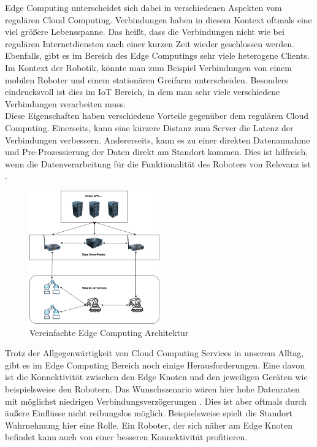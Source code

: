 Edge Computing unterscheidet sich dabei in verschiedenen Aspekten vom regulären Cloud Computing. Verbindungen haben in diesem Kontext oftmals eine viel größere Lebensspanne. Das heißt, dass die Verbindungen nicht wie bei regulären Internetdiensten nach einer kurzen Zeit wieder geschlossen werden. Ebenfalls, gibt es im Bereich des Edge Computings sehr viele heterogene Clients. Im Kontext der Robotik, könnte man zum Beispiel Verbindungen von einem mobilen Roboter und einem stationären Greifarm unterscheiden. Besonders eindrucksvoll ist dies im IoT Bereich, in dem man sehr viele verschiedene Verbindungen verarbeiten muss.\\
Diese Eigenschaften haben verschiedene Vorteile gegenüber dem regulären Cloud Computing. Einerseits, kann eine kürzere Distanz zum Server die Latenz der Verbindungen verbessern. Andererseits, kann es zu einer direkten Datenannahme und Pre-Prozessierung der Daten direkt am Standort kommen. Dies ist hilfreich, wenn die Datenverarbeitung für die Funktionalität des Roboters von Relevanz ist \cite{luntovskyyHighlyDistributedSystemsIoT2022}.

\begin{figure}
  \centering
  \includegraphics[width=0.5\textwidth]{./figures/edge-computing.png}
  \caption{Vereinfachte Edge Computing Architektur}
  \label{fig:edge-computing}
\end{figure}

Trotz der Allgegenwärtigkeit von Cloud Computing Services in unserem Alltag\cite{GartnerForecastsWorldwide2022}, gibt es im Edge Computing Bereich noch einige Herausforderungen. Eine davon ist die Konnektivität zwischen den Edge Knoten und den jeweiligen Geräten wie beispielsweise den Robotern. Das Wunschszenario wären hier hohe Datenraten mit möglichst niedrigen Verbindungsverzögerungen \cite{groshevEdgeRoboticsAre2022}. Dies ist aber oftmals durch äußere Einflüsse nicht reibungslos möglich. Beispielsweise spielt die Standort Wahrnehmung hier eine Rolle. Ein Roboter, der sich näher am Edge Knoten befindet kann auch von einer besseren Konnektivität profitieren.

